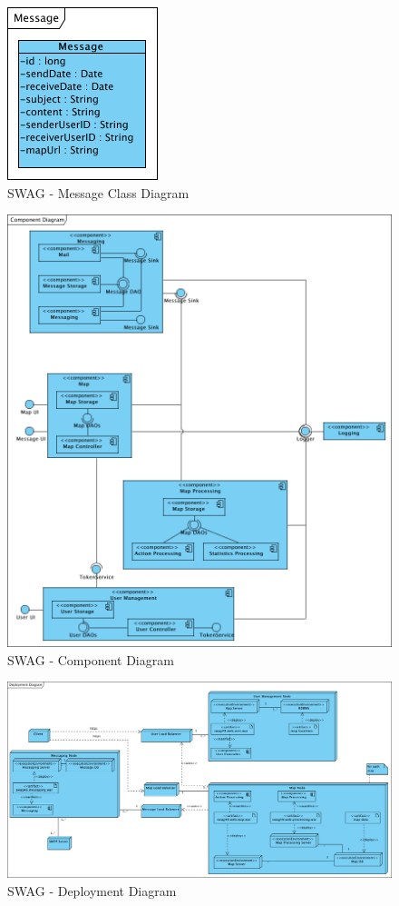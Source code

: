 \documentclass[11pt]{article}
\begin{document}
\begin{figure}[h]
\center
\includegraphics[scale=1]{diagrams/message.png}
\caption{SWAG - Message Class Diagram}
\label{fig:message_cd}
\end{figure}

\begin{figure}[h]
\center
\includegraphics[scale=0.7]{diagrams/component.png}
\caption{SWAG - Component Diagram}
\label{fig:component}
\end{figure}

\begin{figure}[h]
\center
\includegraphics[angle=90, scale=0.6]{diagrams/deployment.png}
\caption{SWAG - Deployment Diagram}
\label{fig:deployment}
\end{figure}

 
\end{document}
